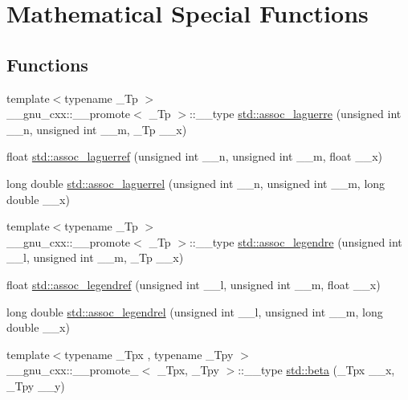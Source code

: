 \hypertarget{group__tr29124__math__spec__func}{}\section{Mathematical Special Functions}
\label{group__tr29124__math__spec__func}
\subsection*{Functions}
\begin{DoxyCompactItemize}
\item 
{\footnotesize template$<$typename \+\_\+\+Tp $>$ }\\\+\_\+\+\_\+gnu\+\_\+cxx\+::\+\_\+\+\_\+promote$<$ \+\_\+\+Tp $>$\+::\+\_\+\+\_\+type \hyperlink{group__tr29124__math__spec__func_ga377bb7e038c464a27dfe0573fd2d7b33}{std\+::assoc\+\_\+laguerre} (unsigned int \+\_\+\+\_\+n, unsigned int \+\_\+\+\_\+m, \+\_\+\+Tp \+\_\+\+\_\+x)
\item 
float \hyperlink{group__tr29124__math__spec__func_gaf83d98f350a1cfcebee6a1f723cf90d2}{std\+::assoc\+\_\+laguerref} (unsigned int \+\_\+\+\_\+n, unsigned int \+\_\+\+\_\+m, float \+\_\+\+\_\+x)
\item 
long double \hyperlink{group__tr29124__math__spec__func_gac8e245671fb2df5de5fd978d03081f6c}{std\+::assoc\+\_\+laguerrel} (unsigned int \+\_\+\+\_\+n, unsigned int \+\_\+\+\_\+m, long double \+\_\+\+\_\+x)
\item 
{\footnotesize template$<$typename \+\_\+\+Tp $>$ }\\\+\_\+\+\_\+gnu\+\_\+cxx\+::\+\_\+\+\_\+promote$<$ \+\_\+\+Tp $>$\+::\+\_\+\+\_\+type \hyperlink{group__tr29124__math__spec__func_ga355349f79119c1fd1e2a9351cec57f0f}{std\+::assoc\+\_\+legendre} (unsigned int \+\_\+\+\_\+l, unsigned int \+\_\+\+\_\+m, \+\_\+\+Tp \+\_\+\+\_\+x)
\item 
float \hyperlink{group__tr29124__math__spec__func_ga3ced07ddd24bf4af56e2712d148e7f57}{std\+::assoc\+\_\+legendref} (unsigned int \+\_\+\+\_\+l, unsigned int \+\_\+\+\_\+m, float \+\_\+\+\_\+x)
\item 
long double \hyperlink{group__tr29124__math__spec__func_ga55977b425a539146f060dec1c8003344}{std\+::assoc\+\_\+legendrel} (unsigned int \+\_\+\+\_\+l, unsigned int \+\_\+\+\_\+m, long double \+\_\+\+\_\+x)
\item 
{\footnotesize template$<$typename \+\_\+\+Tpx , typename \+\_\+\+Tpy $>$ }\\\+\_\+\+\_\+gnu\+\_\+cxx\+::\+\_\+\+\_\+promote\+\_$<$ \+\_\+\+Tpx, \+\_\+\+Tpy $>$\+::\+\_\+\+\_\+type \hyperlink{group__tr29124__math__spec__func_gab8661bda2963e98e66bb5a9dc5378ead}{std\+::beta} (\+\_\+\+Tpx \+\_\+\+\_\+x, \+\_\+\+Tpy \+\_\+\+\_\+y)

\end{DoxyCompactItemize}
